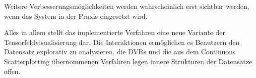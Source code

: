 \documentclass[a4paper,fontsize=12pt,toc=bib,halfparskip]{scrartcl}
\begin{document}
Weitere Verbesserungsm\"oglichkeiten werden wahrscheinlich erst sichtbar werden, wenn das System in der Praxis eingesetzt wird. 

Alles in allem stellt das implementierte Verfahren eine neue Variante der Tensorfeldvisualisierung dar. Die Interaktionen erm\"oglichen es Benutzern den Datensatz explorativ zu analysieren, die DVRs und die aus dem Continuous Scatterplotting \"ubernommenen Verfahren legen innere Strukturen der Datens\"atze offen.


\label{LastPageBeforeRefs}
\clearpage
{}

\printbibliography[type=thesis,title={Abschlussarbeiten}]
\printbibliography[type=book,title={Bücher}]
\printbibliography[filter=papers,title={Artikel}]
\printbibliography[type=online,title={Internetressourcen}]
\label{LastBibPage}
\end{document}
